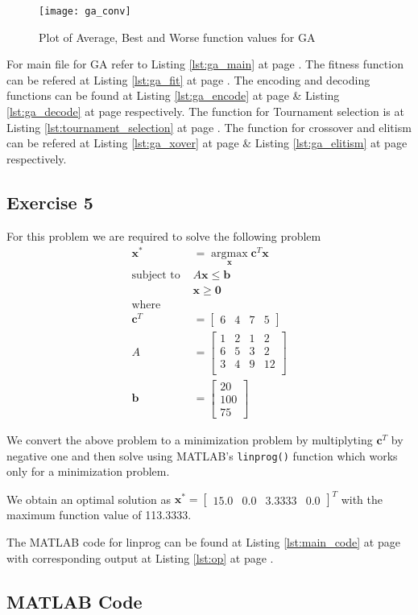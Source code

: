 \documentclass[11pt]{article}
\newcommand{\V}[1]{\pmb{#1}}
\newcommand{\mat}[1]{\begin{bmatrix}#1\end{bmatrix}}
\newcommand{\reflst}[1]{Listing \ref{#1} at page \pageref{#1}}
\begin{document}
\begin{figure}[!h]
 \centering
 \texttt{[image: ga\_conv]}
 \caption{Plot of Average, Best and Worse function values for GA}
 \label{fig:ga_conv}
\end{figure}
\noindent For main file for GA refer to \reflst{lst:ga_main}. The fitness function can be refered at \reflst{lst:ga_fit}. The encoding and decoding functions can be found at \reflst{lst:ga_encode}\& \reflst{lst:ga_decode} respectively. The function for Tournament selection is at \reflst{lst:tournament_selection}. The function for crossover and elitism can be refered at \reflst{lst:ga_xover} \& \reflst{lst:ga_elitism} respectively.


\clearpage
\vspace{2ex}
\subsection*{Exercise 5} 
For this problem we are required to solve the following problem
\begin{align*}
 \V{x}^* &= \operatorname*{argmax}_{\V{x}} \V{c}^T\V{x}\\
 \text{subject to } &A\V{x} \leq \V{b}\\
 & \V{x}\geq \V{0}\\
 \text{where}\\
 \V{c}^T &= \mat{6 & 4 & 7& 5}\\
 A & = \mat{
 1& 2& 1 & 2\\
 6& 5& 3 & 2\\
 3& 4& 9 & 12\\
 }\\
 \V{b}& = \mat{20\\ 100\\ 75} 
\end{align*}

\noindent We convert the above problem to a minimization problem by multiplyting $\V{c}^T$ by negative one and then solve using MATLAB's \texttt{linprog()} function which works only for a minimization problem.

\noindent We obtain an optimal solution as $\V{x}^* = \mat{15.0 & 0.0& 3.3333& 0.0}^T$ with the maximum function value of 113.3333.

\noindent The MATLAB code for linprog can be found at \reflst{lst:main_code} with corresponding output at \reflst{lst:op}.

\newpage
\subsection*{MATLAB Code}



\end{document}
